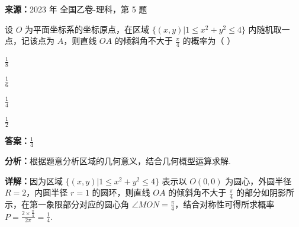\begin{question}[points=5]
\textbf{来源：}2023 年 全国乙卷-理科，第 5 题\par
设 $O$ 为平面坐标系的坐标原点，在区域 $\{(x,y)|1\le x^{2}+y^{2}\le 4\}$ 内随机取一点，记该点为 $A$，则直线 $OA$ 的倾斜角不大于 $\frac{\pi}{4}$ 的概率为（ ）
\begin{choices}
  \item $\frac{1}{8}$
  \item $\frac{1}{6}$
  \item $\frac{1}{4}$
  \item $\frac{1}{2}$
\end{choices}
\begin{solution}
\textbf{答案：}$\frac{1}{4}$

\textbf{分析：}根据题意分析区域的几何意义，结合几何概型运算求解.

\textbf{详解：}因为区域 $\{(x,y)|1\le x^{2}+y^{2}\le 4\}$ 表示以 $O(0,0)$ 为圆心，外圆半径 $R=2$，内圆半径 $r=1$ 的圆环，则直线 $OA$ 的倾斜角不大于 $\frac{\pi}{4}$ 的部分如阴影所示，在第一象限部分对应的圆心角 $\angle MON=\frac{\pi}{4}$，结合对称性可得所求概率 $P=\frac{2\times \frac{\pi}{4}}{2\pi}=\frac{1}{4}$.
\end{solution}
\end{question}

